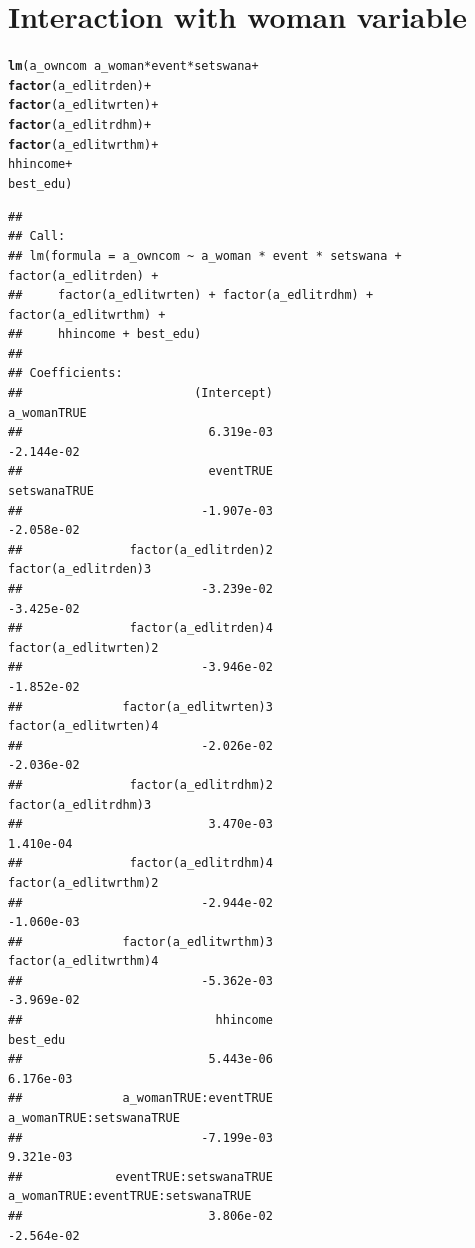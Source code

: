 \documentclass[a4paper,british]{article}\usepackage[]{graphicx}\usepackage[]{xcolor}
\makeatletter
\newcommand{\hlopt}[1]{\textcolor[rgb]{0,0,0}{#1}}%
\newcommand{\hlstd}[1]{\textcolor[rgb]{0.345,0.345,0.345}{#1}}%
\newcommand{\hlkwd}[1]{\textcolor[rgb]{0.737,0.353,0.396}{\textbf{#1}}}%
\newenvironment{kframe}{%
 \def\at@end@of@kframe{}%
 \ifinner\ifhmode%
  \def\at@end@of@kframe{\end{minipage}}%
  \begin{minipage}{\columnwidth}%
 \fi\fi%
 \def\FrameCommand##1{\hskip\@totalleftmargin \hskip-\fboxsep
 \colorbox{shadecolor}{##1}\hskip-\fboxsep
     \hskip-\linewidth \hskip-\@totalleftmargin \hskip\columnwidth}%
 \MakeFramed {\advance\hsize-\width
   \@totalleftmargin\z@ \linewidth\hsize
   \@setminipage}}%
 {\par\unskip\endMakeFramed%
 \at@end@of@kframe}
\newenvironment{knitrout}{}{} %
\makeatother
\begin{document}
\section{Interaction with woman variable}

\begin{table}[H]
\caption{Women Owning a Computer}

\begin{knitrout}
\color{fgcolor}\begin{kframe}
\begin{alltt}
\hlkwd{lm}\hlstd{(a_owncom} \hlopt{~} \hlstd{a_woman}\hlopt{*}\hlstd{event}\hlopt{*}\hlstd{setswana} \hlopt{+}
              \hlkwd{factor}\hlstd{(a_edlitrden)}    \hlopt{+}
              \hlkwd{factor}\hlstd{(a_edlitwrten)}   \hlopt{+}
              \hlkwd{factor}\hlstd{(a_edlitrdhm)}    \hlopt{+}
              \hlkwd{factor}\hlstd{(a_edlitwrthm)}   \hlopt{+}
              \hlstd{hhincome}               \hlopt{+}
              \hlstd{best_edu                )}
\end{alltt}
\begin{verbatim}
## 
## Call:
## lm(formula = a_owncom ~ a_woman * event * setswana + factor(a_edlitrden) + 
##     factor(a_edlitwrten) + factor(a_edlitrdhm) + factor(a_edlitwrthm) + 
##     hhincome + best_edu)
## 
## Coefficients:
##                        (Intercept)                         a_womanTRUE  
##                          6.319e-03                          -2.144e-02  
##                          eventTRUE                        setswanaTRUE  
##                         -1.907e-03                          -2.058e-02  
##               factor(a_edlitrden)2                factor(a_edlitrden)3  
##                         -3.239e-02                          -3.425e-02  
##               factor(a_edlitrden)4               factor(a_edlitwrten)2  
##                         -3.946e-02                          -1.852e-02  
##              factor(a_edlitwrten)3               factor(a_edlitwrten)4  
##                         -2.026e-02                          -2.036e-02  
##               factor(a_edlitrdhm)2                factor(a_edlitrdhm)3  
##                          3.470e-03                           1.410e-04  
##               factor(a_edlitrdhm)4               factor(a_edlitwrthm)2  
##                         -2.944e-02                          -1.060e-03  
##              factor(a_edlitwrthm)3               factor(a_edlitwrthm)4  
##                         -5.362e-03                          -3.969e-02  
##                           hhincome                            best_edu  
##                          5.443e-06                           6.176e-03  
##              a_womanTRUE:eventTRUE            a_womanTRUE:setswanaTRUE  
##                         -7.199e-03                           9.321e-03  
##             eventTRUE:setswanaTRUE  a_womanTRUE:eventTRUE:setswanaTRUE  
##                          3.806e-02                          -2.564e-02
\end{verbatim}
\end{kframe}
\end{knitrout}
\end{table}
\end{document}
